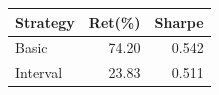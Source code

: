{\tiny\setlength{\tabcolsep}{2pt}\begin{tabular}{lrr} \toprule
Strategy & Ret(\%) & Sharpe \\ \midrule
Basic & 74.20 & 0.542 \\ 
Interval & 23.83 & 0.511 \\ 
\bottomrule \end{tabular}}